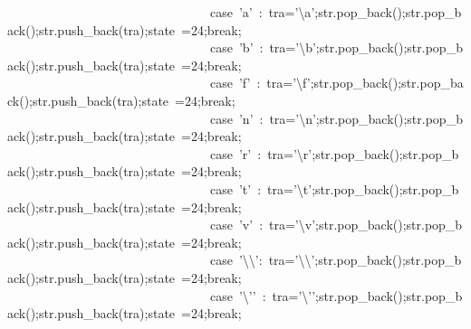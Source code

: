 \documentclass{article}
\begin{document}
\begin{mdpre}
~~~~~~~~~~~~~~~~~~~~~~~~~~~~~~~~{case}~{'a'}~:~tra={'}{\textbackslash{}a}{'};str.pop\_back();str.pop\_back();str.push\_back(tra);state~={24};{break};\\
~~~~~~~~~~~~~~~~~~~~~~~~~~~~~~~~{case}~{'b'}~:~tra={'}{\textbackslash{}b}{'};str.pop\_back();str.pop\_back();str.push\_back(tra);state~={24};{break};\\
~~~~~~~~~~~~~~~~~~~~~~~~~~~~~~~~{case}~{'f'}~:~tra={'}{\textbackslash{}f}{'};str.pop\_back();str.pop\_back();str.push\_back(tra);state~={24};{break};\\
~~~~~~~~~~~~~~~~~~~~~~~~~~~~~~~~{case}~{'n'}~:~tra={'}{\textbackslash{}n}{'};str.pop\_back();str.pop\_back();str.push\_back(tra);state~={24};{break};\\
~~~~~~~~~~~~~~~~~~~~~~~~~~~~~~~~{case}~{'r'}~:~tra={'}{\textbackslash{}r}{'};str.pop\_back();str.pop\_back();str.push\_back(tra);state~={24};{break};\\
~~~~~~~~~~~~~~~~~~~~~~~~~~~~~~~~{case}~{'t'}~:~tra={'}{\textbackslash{}t}{'};str.pop\_back();str.pop\_back();str.push\_back(tra);state~={24};{break};\\
~~~~~~~~~~~~~~~~~~~~~~~~~~~~~~~~{case}~{'v'}~:~tra={'}{\textbackslash{}v}{'};str.pop\_back();str.pop\_back();str.push\_back(tra);state~={24};{break};\\
~~~~~~~~~~~~~~~~~~~~~~~~~~~~~~~~{case}~{'}{\textbackslash{}\textbackslash{}}{'}:~tra={'}{\textbackslash{}\textbackslash{}}{'};str.pop\_back();str.pop\_back();str.push\_back(tra);state~={24};{break};\\
~~~~~~~~~~~~~~~~~~~~~~~~~~~~~~~~{case}~{'}{\textbackslash{}'}{'}~:~tra={'}{\textbackslash{}'}{'};str.pop\_back();str.pop\_back();str.push\_back(tra);state~={24};{break};\\

\end{mdpre}
\end{document}
